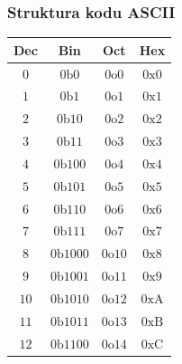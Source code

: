 \documentclass[10pt,t]{beamer}
\newcommand{\btext}{\text{b}}
\newcommand{\otext}{\text{o}}
\newcommand{\xtext}{\text{x}}
\newcommand{\Atext}{\text{A}}
\newcommand{\Btext}{\text{B}}
\newcommand{\Ctext}{\text{C}}
\begin{document}
\begin{frame}
  \frametitle{Struktura kodu ASCII}


  \begin{center}

    \begin{tabular}{|c|c|c|c|}
      \hline
      Dec & Bin & Oct & Hex \\
      \hline
      \hphantom{0}$0$ & $0\btext 0$\hphantom{000}
                & $0\otext 0$\hphantom{0} & $0\xtext 0$ \\
      \hphantom{0}$1$ & $0\btext 1$\hphantom{000}
                & $0\otext 1$\hphantom{0} & $0\xtext 1$ \\
      \hphantom{0}$2$ & $0\btext 10$\hphantom{00}
                & $0\otext 2$\hphantom{0} & $0\xtext 2$ \\
      \hphantom{0}$3$ & $0\btext 11$\hphantom{00}
                & $0\otext 3$\hphantom{0} & $0\xtext 3$ \\
      \hphantom{0}$4$ & $0\btext 100$\hphantom{0}
                & $0\otext 4$\hphantom{0} & $0\xtext 4$ \\
      \hphantom{0}$5$ & $0\btext 101$\hphantom{0}
                & $0\otext 5$\hphantom{0} & $0\xtext 5$ \\
      \hphantom{0}$6$ & $0\btext 110$\hphantom{0}
                & $0\otext 6$\hphantom{0} & $0\xtext 6$ \\
      \hphantom{0}$7$ & $0\btext 111$\hphantom{0}
                & $0\otext 7$\hphantom{0} & $0\xtext 7$ \\
      \hphantom{0}$8$ & $0\btext 1000$ & $0\otext 10$ & $0\xtext 8$ \\
      \hphantom{0}$9$ & $0\btext 1001$ & $0\otext 11$ & $0\xtext 9$ \\
      $10$ & $0\btext 1010$ & $0\otext 12$ & $0\xtext \Atext$ \\
      $11$ & $0\btext 1011$ & $0\otext 13$ & $0\xtext \Btext$ \\
      $12$ & $0\btext 1100$ & $0\otext 14$ & $0\xtext \Ctext$ \\
      \hline
    \end{tabular}

  \end{center}

\end{frame}
\end{document}
